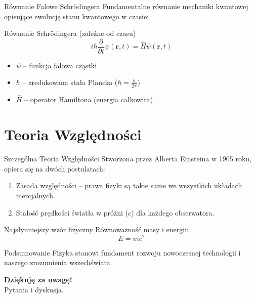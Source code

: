 \documentclass[aspectratio=169]{beamer}
\begin{document}
\begin{frame}{Równanie Falowe Schrödingera}
    Fundamentalne równanie mechaniki kwantowej opisujące ewolucję stanu kwantowego w czasie:
    
    \begin{block}{Równanie Schrödingera (zależne od czasu)}
        \begin{equation}
            i \hbar \frac{\partial}{\partial t} \psi(\mathbf{r}, t) = \hat{H} \psi(\mathbf{r}, t)
        \end{equation}
    \end{block}
    
    \begin{itemize}
        \item $\psi$ – funkcja falowa cząstki
        \item $\hbar$ – zredukowana stała Plancka ($\hbar = \frac{h}{2\pi}$)
        \item $\hat{H}$ – operator Hamiltona (energia całkowita)
    \end{itemize}
\end{frame}

\section{Teoria Względności}

\begin{frame}{Szczególna Teoria Względności}
    Stworzona przez Alberta Einsteina w 1905 roku, opiera się na dwóch postulatach:
    
    \begin{enumerate}
        \item Zasada względności – prawa fizyki są takie same we wszystkich układach inercjalnych.
        \item Stałość prędkości światła w próżni ($c$) dla każdego obserwatora.
    \end{enumerate}
    
    \begin{exampleblock}{Najsłynniejszy wzór fizyczny}
        Równoważność masy i energii:
        \begin{equation}
            E = m c^2
        \end{equation}
    \end{exampleblock}
\end{frame}

\begin{frame}{Podsumowanie}
    Fizyka stanowi fundament rozwoju nowoczesnej technologii i naszego zrozumienia wszechświata.
    
    \vspace{0.4cm}
    \begin{center}
        \textbf{Dziękuję za uwagę!} \\
        \vspace{0.2cm}
        Pytania i dyskusja.
    \end{center}
\end{frame}
\end{document}
